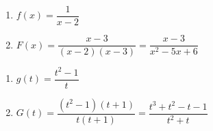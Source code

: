 \documentclass{ximera}
\begin{document}
\begin{multicols}{2}
\begin{enumerate}
\setcounter{enumi}{\value{HW}}

\item $f(x) = \dfrac{1}{x - 2}$
\item $F(x) = \dfrac{x-3}{(x-2)(x-3)} = \dfrac{x-3}{x^2-5x+6}$

\setcounter{HW}{\value{enumi}}
\end{enumerate}
\end{multicols}

\begin{multicols}{2}
\begin{enumerate}
\setcounter{enumi}{\value{HW}}


\item $g(t) =\dfrac{t^2-1}{t}$
\item $G(t) = \dfrac{(t^2-1)(t+1)}{t(t+1)} = \dfrac{t^3+t^2-t-1}{t^2+t}$


\setcounter{HW}{\value{enumi}}
\end{enumerate}
\end{multicols}
\end{document}
